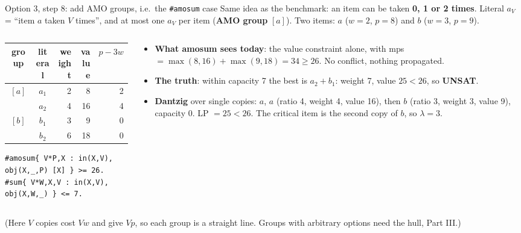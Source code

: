 \documentclass[aspectratio=169,11pt]{beamer}
\begin{document}
\begin{frame}[fragile]{Option 3, step 8: add AMO groups, i.e.\ the \texttt{\#amosum} case}
\footnotesize
Same idea as the benchmark: an item can be taken \textbf{0, 1 or 2 times}. Literal $a_V$ = ``item $a$ taken $V$ times'',
and at most one $a_V$ per item (\textbf{AMO group} $[a]$). Two items: $a$ ($w{=}2$, $p{=}8$) and $b$ ($w{=}3$, $p{=}9$).
\begin{columns}[T]
\begin{column}{.5\textwidth}
\begin{center}
\begin{tabular}{ccrrr}\toprule
group & literal & weight & value & $p - 3w$\\\midrule
$[a]$ & $a_1$ & 2 & 8 & 2\\
      & $a_2$ & 4 & 16 & 4\\
$[b]$ & $b_1$ & 3 & 9 & 0\\
      & $b_2$ & 6 & 18 & 0\\\bottomrule
\end{tabular}
\end{center}
\begin{lstlisting}
#amosum{ V*P,X : in(X,V), obj(X,_,P) [X] } >= 26.
#sum{ V*W,X,V : in(X,V), obj(X,W,_) } <= 7.
\end{lstlisting}
\end{column}
\begin{column}{.48\textwidth}
\begin{itemize}\setlength\itemsep{2pt}
\item \textbf{What amosum sees today}: the value constraint alone, with mps $= \max(8,16) + \max(9,18) = 34 \ge 26$.
  No conflict, nothing propagated.
\item \textbf{The truth}: within capacity 7 the best is $a_2 + b_1$: weight 7, value $25 < 26$, so \textbf{UNSAT}.
\item \textbf{Dantzig} over single copies: $a$, $a$ (ratio 4, weight 4, value 16), then $b$ (ratio 3, weight 3, value 9),
  capacity 0. LP $= 25 < 26$. The critical item is the second copy of $b$, so $\lambda = 3$.
\end{itemize}
\end{column}
\end{columns}
\vspace{1mm}
(Here $V$ copies cost $V w$ and give $V p$, so each group is a straight line. Groups with arbitrary options need the hull, Part III.)
\end{frame}
\end{document}
